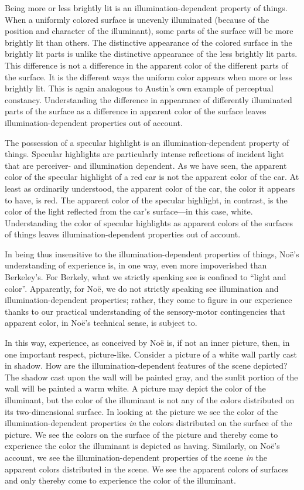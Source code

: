 \documentclass[12pt]{article}
\begin{document}
Being more or less brightly lit is an illumination-dependent property of things. When a uniformly colored surface is unevenly illuminated (because of the position and character of the illuminant), some parts of the surface will be more brightly lit than others. The distinctive appearance of the colored surface in the brightly lit parts is unlike the distinctive appearance of the less brightly lit parts. This difference is not a difference in the apparent color of the different parts of the surface. It is the different ways the uniform color appears when more or less brightly lit. This is again analogous to Austin's own example of perceptual constancy. Understanding the difference in appearance of differently illuminated parts of the surface as a difference in apparent color of the surface leaves illumination-dependent properties out of account.

The possession of a specular highlight is an illumination-dependent property of things. Specular highlights are particularly intense reflections of incident light that are perceiver- and illumination dependent. As we have seen, the apparent color of the specular highlight of a red car is not the apparent color of the car. At least as ordinarily understood, the apparent color of the car, the color it appears to have, is red. The apparent color of the specular highlight, in contrast, is the color of the light reflected from the car's surface---in this case, white. Understanding the color of specular highlights as apparent colors of the surfaces of things leaves illumination-dependent properties out of account.

In being thus insensitive to the illumination-dependent properties of things, Noë's understanding of experience is, in one way, even more impoverished than Berkeley's. For Berkely, what we strictly speaking see is confined to ``light and color''. Apparently, for Noë, we do not strictly speaking see illumination and illumination-dependent properties; rather, they come to figure in our experience thanks to our practical understanding of the sensory-motor contingencies that apparent color, in Noë's technical sense, is subject to. 

In this way, experience, as conceived by Noë is, if not an inner picture, then, in one important respect, picture-like. Consider a picture of a white wall partly cast in shadow. How are the illumination-dependent features of the scene depicted? The shadow cast upon the wall will be painted gray, and the sunlit portion of the wall will be painted a warm white. A picture may depict the color of the illuminant, but the color of the illuminant is not any of the colors distributed on its two-dimensional surface. In looking at the picture we see the color of the illumination-dependent properties \emph{in} the colors distributed on the surface of the picture. We see the colors on the surface of the picture and thereby come to experience the color the illuminant is depicted as having. Similarly, on Noë's account, we see the illumination-dependent properties of the scene \emph{in} the apparent colors distributed in the scene. We see the apparent colors of surfaces and only thereby come to experience the color of the illuminant. 
\end{document}
